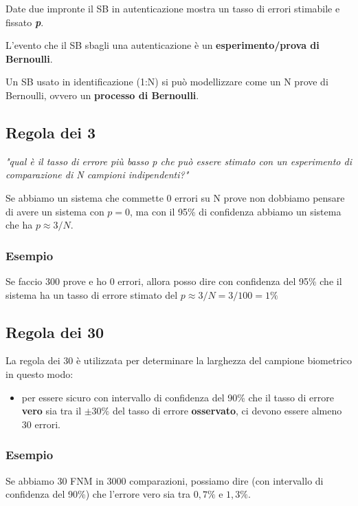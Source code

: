 \noindent Date due impronte il SB in autenticazione mostra un tasso di errori stimabile e fissato \textit{\textbf{p}}.

\noindent L'evento che il SB sbagli una autenticazione è un \textbf{esperimento/prova di Bernoulli}.

\noindent Un SB usato in identificazione (1:N) si può modellizzare come un N prove di Bernoulli, 
ovvero un \textbf{processo di Bernoulli}.

\subsection{Regola dei 3}

\textit{"qual è il tasso di errore più basso p che può essere stimato con un esperimento
di comparazione di N campioni indipendenti?"}

\noindent Se abbiamo un sistema che commette 0 errori su N prove non dobbiamo pensare di
avere un sistema con $p=0$, ma con il 95\% di confidenza abbiamo un sistema
che ha $p \approx 3/N$.

\subsubsection{Esempio}

Se faccio 300 prove e ho 0 errori, allora posso dire con confidenza del 95\% che
il sistema ha un tasso di errore stimato del $p \approx 3/N = 3/100 = 1\%$

\subsection{Regola dei 30}

La regola dei 30 è utilizzata per determinare la larghezza del campione biometrico in questo modo:
\begin{itemize}
    \item per essere sicuro con intervallo di confidenza del 90\% che il tasso di errore \textbf{vero}
    sia tra il $\pm 30 \%$ del tasso di errore \textbf{osservato}, ci devono essere almeno 30 errori.    
\end{itemize}

\subsubsection{Esempio}
Se abbiamo 30 FNM in 3000 comparazioni, possiamo dire (con intervallo di 
confidenza del 90\%) che l'errore vero sia tra $0,7\%$ e $1,3\%$.